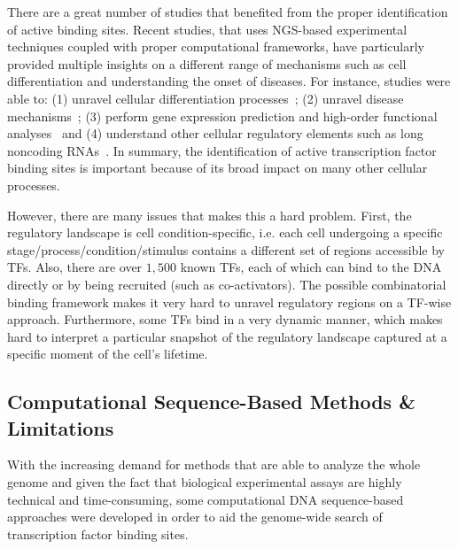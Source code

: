 There are a great number of studies that benefited from the proper identification of active binding sites. Recent studies, that uses NGS-based experimental techniques coupled with proper computational frameworks, have particularly provided multiple insights on a different range of mechanisms such as cell differentiation and understanding the onset of diseases. For instance, studies were able to: (1) unravel cellular differentiation processes~\cite{lin2015,tsankov2015}; (2) unravel disease mechanisms~\cite{schaub2012,vernot2012,charos2012}; (3) perform gene expression prediction and high-order functional analyses~\cite{yip2012,whitfield2012,natarajan2012} and (4) understand other cellular regulatory elements such as long noncoding RNAs~\cite{tilgner2012,banfai2012}. In summary, the identification of active transcription factor binding sites is important because of its broad impact on many other cellular processes.

However, there are many issues that makes this a hard problem. First, the regulatory landscape is cell condition-specific, i.e. each cell undergoing a specific stage/process/condition/stimulus contains a different set of regions accessible by TFs. Also, there are over $1,500$ known TFs, each of which can bind to the DNA directly or by being recruited (such as co-activators). The possible combinatorial binding framework makes it very hard to unravel regulatory regions on a TF-wise approach. Furthermore, some TFs bind in a very dynamic manner, which makes hard to interpret a particular snapshot of the regulatory landscape captured at a specific moment of the cell's lifetime.

\subsection{Computational Sequence-Based Methods \& Limitations}
\label{sec:computational.sequence.method}

With the increasing demand for methods that are able to analyze the whole genome and given the fact that biological experimental assays are highly technical and time-consuming, some computational DNA sequence-based approaches were developed in order to aid the genome-wide search of transcription factor binding sites.

